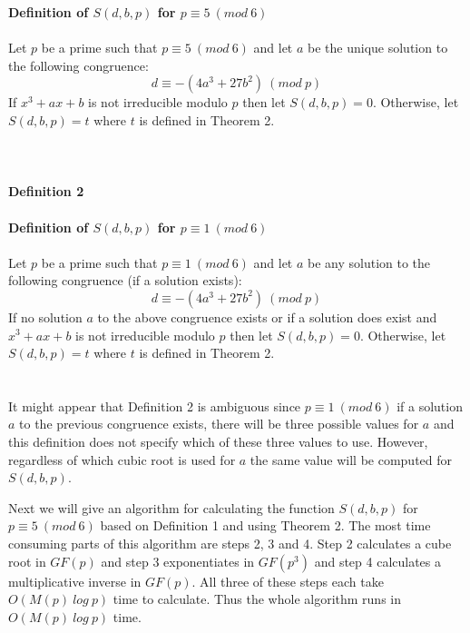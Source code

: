 \documentclass[final,letterpaper,oneside,10pt]{article}
\begin{document}
\textbf{Definition of $S(d,b,p)$ for $p \equiv 5~(mod~6)$}
\\
\\
Let $p$ be a prime such that $p \equiv 5~(mod~6)$ and let $a$ be the unique solution to the following congruence:
\[d \equiv -(4a^3+27b^2)~(mod~p) \]
If $x^3+ax+b$ is not irreducible modulo $p$ then let $S(d,b,p)=0$.   Otherwise, let $S(d,b,p)=t$ where $t$ is defined in Theorem 2.
\\
\\
\\
\\
\textbf{Definition 2}
\\
\\
\textbf{Definition of $S(d,b,p)$ for $p \equiv 1~(mod~6)$}
\\
\\
Let $p$ be a prime such that $p \equiv 1~(mod~6)$ and let $a$ be any solution to the following congruence (if a solution exists):
\[d \equiv -(4a^3+27b^2)~(mod~p) \]
If no solution $a$ to the above congruence exists or if a solution does exist and
$x^3+ax+b$ is not irreducible modulo $p$ then let $S(d,b,p)=0$.   Otherwise, let $S(d,b,p)=t$ where $t$ is defined in Theorem 2.
\\
\\
\\
It might appear that Definition 2 is ambiguous since $p \equiv 1~(mod~6)$ if a solution $a$ to the previous congruence exists, there will be 
three possible values for $a$ and this definition does not specify which of these three values to use.  However, regardless of which cubic root 
is used for $a$ the same value will be computed for $S(d,b,p)$.

Next we will give an algorithm for calculating the function $S(d,b,p)$ for $p \equiv 5~(mod~6)$ based on Definition 1 and using Theorem 2.  The
most time consuming parts of this algorithm are steps 2, 3 and 4.  Step 2 calculates a cube root in $GF(p)$ and step 3 exponentiates in $GF(p^3)$
and step 4 calculates a multiplicative inverse in $GF(p)$.  All three of these steps each take $O(M(p)~log~p)$ time to calculate.  Thus the whole
algorithm runs in $O(M(p)~log~p)$ time.
\end{document}
